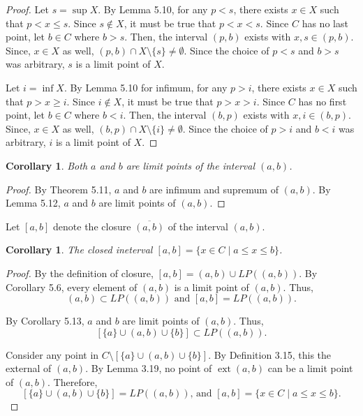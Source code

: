 \documentclass{amsart}
\newtheorem{corollary}[theorem]{Corollary}
\newcommand{\1}{\mathds{1}}
\DeclareMathOperator{\ext}{ext}
\numberwithin{equation}{section}
\numberwithin{theorem}{section}
\begin{document}
\begin{proof}
	Let $s = \sup X$. By Lemma 5.10, for any $p<s$, there exists $x\in X$ such that $p < x \le s$. Since $s\notin X$, it must be true that $p < x < s$. Since $C$ has no last point, let $b\in C$ where $b>s$. Then, the interval $(p,b)$ exists with $x,s\in (p,b)$. Since, $x\in X$ as well,  $(p,b) \cap X\setminus\{s\} \not= \emptyset$. Since the choice of $p<s$ and $b>s$ was arbitrary, $s$ is a limit point of $X$.
	
	Let $i = \inf X$. By Lemma 5.10 for infimum, for any $p>i$, there exists $x\in X$ such that $p > x \ge i$. Since $i\notin X$, it must be true that $p > x > i$. Since $C$ has no first point, let $b\in C$ where $b<i$. Then, the interval $(b,p)$ exists with $x,i\in (b,p)$. Since, $x\in X$ as well,  $(b,p) \cap X\setminus\{i\} \not= \emptyset$. Since the choice of $p>i$ and $b<i$ was arbitrary, $i$ is a limit point of $X$.
\end{proof}

\begin{corollary}  Both $a$ and $b$ are limit points of the interval $(a,b)$.
\end{corollary}

\begin{proof}
	By Theorem 5.11, $a$ and $b$ are infimum and supremum of $(a,b)$. By Lemma 5.12, $a$ and $b$ are limit points of $(a,b)$.
\end{proof}

Let $[a, b]$ denote the closure $\overline{(a,b)}$ of the interval $(a,b)$.  

\begin{corollary}
The closed ineterval $[a, b] = \{x \in C \mid a \leq x \leq b  \}$.
\end{corollary}

\begin{proof}
	By the definition of closure, $[a, b] = (a,b) \cup LP((a,b))$. By Corollary 5.6, every element of $(a,b)$ is a limit point of $(a,b)$. Thus, 
	$$(a,b) \subset LP((a,b)) \text{ and } [a, b] = LP((a,b)).$$
	
	By Corollary 5.13, $a$ and $b$ are limit points of $(a,b)$. Thus, $$\left[\{a\} \cup (a,b) \cup \{b\} \right] \subset LP((a,b)).$$
	
	Consider any point in $C\setminus \left[ \{a\} \cup (a,b) \cup \{b\} \right]$. By Definition 3.15, this the external of $(a,b)$. By Lemma 3.19, no point of $\ext(a,b)$ can be a limit point of $(a,b)$. Therefore, $$\left[ \{a\} \cup (a,b) \cup \{b\} \right] = LP((a,b)) \text{, and } [a, b] = \{x \in C \mid a \leq x \leq b  \}.$$
\end{proof}
\end{document}
